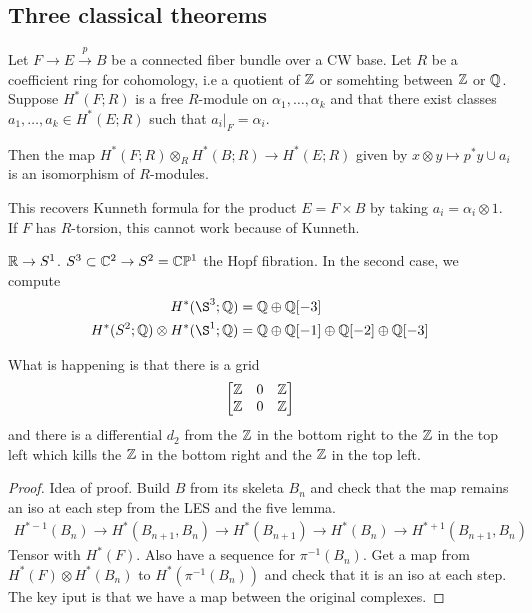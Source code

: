 \documentclass[12pt]{article}
\begin{document}
\subsection{Three classical theorems}
\begin{theorem}
    Let $F\to E \xrightarrow{p} B$ be a connected fiber bundle over a CW base. Let $R$ be a coefficient ring for cohomology, i.e a quotient of $\mathbb{Z}$ or somehting between $\mathbb{Z}$ or $\mathbb{Q}$. Suppose $H^*(F;R)$ is a free $R$-module on $\alpha_1,\dots, \alpha_k$ and that there exist classes $a_1,\dots,a_k \in H^*(E;R)$ such that $a_i\vert_F = \alpha_i$. 
    
    Then the map $H^*(F;R)\otimes_R H^*(B;R) \to H^*(E;R)$ given by $x\otimes y \mapsto p^*y \cup a_i$ is an isomorphism of $R$-modules.
\end{theorem}
\begin{remark}
    This recovers Kunneth formula for the product $E = F\times B$ by taking $a_i = \alpha_i \otimes 1$. If $F$ has $R$-torsion, this cannot work because of Kunneth.
\end{remark}

\begin{example}
    [Nonexamples] $\mathbb{R} \to S^1$. $S^3 \subset \mathbb{C}^2 \to S^2 = \mathbb{C}\mathbb{P}^1$ the Hopf fibration. In the second case, we compute \begin{align*}
        H^*(\S^3; \Q) &= \Q \oplus \Q[-3] \\
        H^*(S^2; \Q) \otimes H^*(\S^1; \Q) &= \Q \oplus \Q[-1] \oplus \Q[-2] \oplus \Q[-3]
        \end{align*}
\end{example}

What is happening is that there is a grid \[\begin{bmatrix}
    \mathbb{Z} & 0 & \mathbb{Z} \\
    \mathbb{Z} & 0 & \mathbb{Z} \\
\end{bmatrix}\] and there is a differential $d_2$ from the $\mathbb{Z}$ in the bottom right to the $\mathbb{Z}$ in the top left which kills the $\mathbb{Z}$ in the bottom right and the $\mathbb{Z}$ in the top left. 

\begin{proof}
    Idea of proof. Build $B$ from its skeleta $B_n$ and check that the map remains an iso at each step from the LES and the five lemma. \begin{align*}
        H^{*-1}(B_n) \to H^*(B_{n+1}, B_n) \to H^*(B_{n+1}) \to H^*(B_n) \to H^{*+1}(B_{n+1}, B_n)
    \end{align*}
    Tensor with $H^*(F)$. Also have a sequence for $\pi^{-1}(B_n)$. Get a map from $H^*(F)\otimes H^*(B_n)$ to $H^*(\pi^{-1}(B_n))$ and check that it is an iso at each step. The key iput is that we have a map between the original complexes.
\end{proof}
\end{document}
